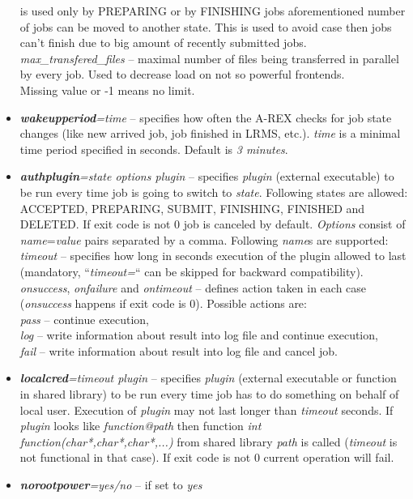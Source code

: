 \documentclass{article}                            %
\begin{document}
\begin{itemize}
is used only by PREPARING or by FINISHING jobs aforementioned number
of jobs can be moved to another state. This is used to avoid case
then jobs can't finish due to big amount of recently submitted jobs.\textit{}\\
\textit{max\_transfered\_files} -- maximal number of files being transferred
in parallel by every job. Used to decrease load on not so powerful
frontends.\\
Missing value or -1 means no limit.
\item \textbf{\textit{wakeupperiod}}\textit{=time} -- specifies how often
the A-REX checks for job state changes (like new arrived job, job
finished in LRMS, etc.). \textit{time} is a minimal time period specified
in seconds. Default is \emph{3 minutes}.
\item \textbf{\textit{authplugin}}\textit{=state options plugin} -- specifies
\emph{plugin} (external executable) to be run every time job is going
to switch to \emph{state}. Following states are allowed: ACCEPTED,
PREPARING, SUBMIT, FINISHING, FINISHED and DELETED. If exit code is
not 0 job is canceled by default. \textit{Options} consist of \textit{name}=\textit{value}
pairs separated by a comma. Following \textit{name}s are supported:\\
\textit{timeout} -- specifies how long in seconds execution of the
plugin allowed to last (mandatory, {}``\textit{timeout=}{}`` can
be skipped for backward compatibility).\\
\textit{onsuccess}, \textit{onfailure} and \textit{ontimeout} -- defines
action taken in each case (\textit{onsuccess} happens if exit code
is 0). Possible actions are:\\
\textit{pass} -- continue execution,\\
\textit{log} -- write information about result into log file and continue
execution,\\
\textit{fail} -- write information about result into log file and cancel
job.
\item \textbf{\textit{localcred}}\textit{=timeout plugin} -- specifies \emph{plugin}
(external executable or function in shared library) to be run every
time job has to do something on behalf of local user. Execution of
\emph{plugin} may not last longer than \emph{timeout} seconds. If
\emph{plugin} looks like \emph{function@path} then function \emph{int
function(char{*},char{*},char{*},...)} from shared library \emph{path}
is called (\emph{timeout} is not functional in that case). If exit
code is not 0 current operation will fail.
\item \textbf{\textit{norootpower}}\textit{=yes/no} -- if set to \emph{yes}

\end{itemize}
\end{document}
